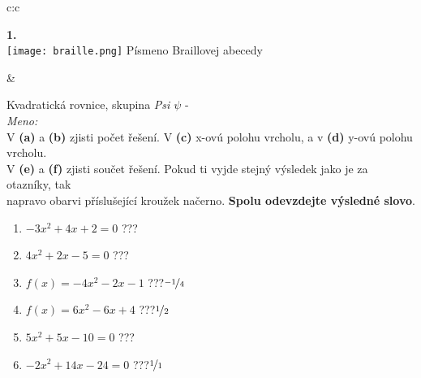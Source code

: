\documentclass[10pt]{report}
\begin{document}
\begin{tabular}{c:c}
\begin{minipage}[c][99mm][t]{0.49\linewidth}
\begin{center}
\begin{minipage}{0.20\linewidth}
\begin{center}
{\Huge\bfseries 1.} \\[2mm]
\texttt{[image: braille.png]}
{\small Písmeno Braillovej abecedy}
\end{center}
\end{minipage}
\end{center}
\end{minipage}
&
\begin{minipage}[c][99mm][t]{0.49\linewidth}
\begin{center}
\vspace{7mm}
{\huge Kvadratická rovnice, skupina \textit{Psi $\psi$} -}\\[4.5mm]
\textit{Meno:}\phantom{xxxxxxxxxxxxxxxxxxxxxxxxxxxxxxxxxxxxxxxxxxxxxxxxxxxxxxxxxxxxxxxxx}\\[3.5mm]
V \textbf{(a)} a \textbf{(b)} zjisti počet řešení. V \textbf{(c)} x-ovú polohu vrcholu, a v \textbf{(d)} y-ovú polohu vrcholu.\\V \textbf{(e)} a \textbf{(f)} zjisti součet řešení. Pokud ti vyjde stejný výsledek jako je za otazníky, tak\\napravo obarvi příslušející kroužek načerno. \textbf{Spolu odevzdejte výsledné slovo}.\\[3mm]
\begin{minipage}{0.77\linewidth}
\begin{center}
\begin{varwidth}{\textwidth}
\begin{enumerate}
\large
\item $-3x^2+4x+2=0$\quad \dotfill\; ???\;\dotfill {}
\item $4x^2+2x-5=0$\quad \dotfill\; ???\;\dotfill {}
\item $f(x)=-4x^2-2x-1$\quad \dotfill\; ???\;\dotfill \quad $\nicefrac{-1}{4}$
\item $f(x)=6x^2-6x+4$\quad \dotfill\; ???\;\dotfill \quad $\nicefrac{1}{2}$
\item $5x^2+5x-10=0$\quad \dotfill\; ???\;\dotfill {}
\item $-2x^2+14x-24=0$\quad \dotfill\; ???\;\dotfill \quad $\nicefrac{1}{1}$
\end{enumerate}
\end{varwidth}
\end{center}
\end{minipage}
\begin{minipage}{0.20\linewidth}

\end{minipage}
\end{center}
\end{minipage}
\end{tabular}
\end{document}
